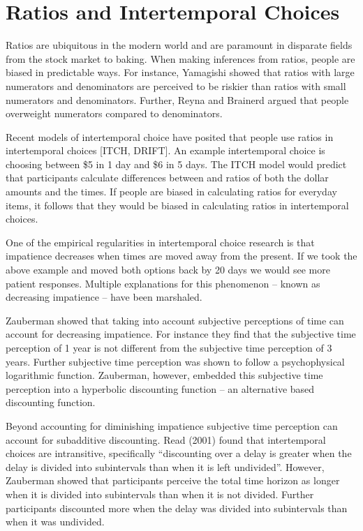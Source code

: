 \documentclass[]{article}
\begin{document}
\section{Ratios and Intertemporal Choices}


Ratios are ubiquitous in the modern world and are paramount in disparate fields from the stock market to baking. 
When making inferences from ratios, people are biased in predictable ways.
For instance, Yamagishi showed that ratios with large numerators and denominators are perceived to be riskier than ratios with small numerators and denominators. Further, Reyna and Brainerd argued that people overweight numerators compared to denominators.

Recent models of intertemporal choice have posited that people use ratios in intertemporal choices [ITCH, DRIFT]. 
An example intertemporal choice is choosing between \$5 in 1 day and \$6 in 5 days. 
The ITCH model would predict that participants calculate differences between and ratios of both the dollar amounts and the times. 
If people are biased in calculating ratios for everyday items, it follows that they would be biased in calculating ratios in intertemporal choices. 

One of the empirical regularities in intertemporal choice research is that impatience decreases when times are moved away from the present.
If we took the above example and moved both options back by 20 days we would see more patient responses. 
Multiple explanations for this phenomenon -- known as decreasing impatience -- have been marshaled. 

Zauberman showed that taking into account subjective perceptions of time can account for decreasing impatience. 
For instance they find that the subjective time perception of 1 year is not different from the subjective time perception of 3 years. 
Further subjective time perception was shown to follow a psychophysical logarithmic function. Zauberman, however, embedded this subjective time perception into a hyperbolic discounting function – an alternative based discounting function.  

Beyond accounting for diminishing impatience subjective time perception can account for subadditive discounting. 
Read (2001) found that intertemporal choices are intransitive, specifically “discounting over a delay is greater when the delay is divided into subintervals than when it is left undivided”. 
However, Zauberman showed that participants perceive the total time horizon as longer when it is divided into subintervals than when it is not divided. 
Further participants discounted more when the delay was divided into subintervals than when it was undivided. 
\end{document}
